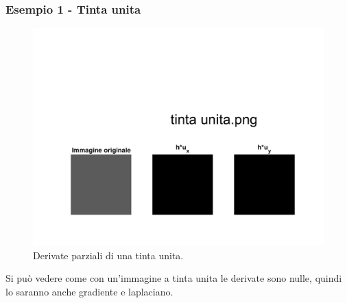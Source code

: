 \subsubsection{Esempio 1 - Tinta unita}
\begin{figure}[htb]
\centering
\includegraphics[scale=0.4, trim = 0 2cm 0 11.5cm, clip]{Pictures/Risultati/tinta unita bianco e nero derivate parziali.png}
\caption{Derivate parziali di una tinta unita.}\label{fig:figura}
\end{figure}

Si può vedere come con un'immagine a tinta unita le derivate sono nulle, quindi lo saranno anche gradiente e laplaciano.\\

